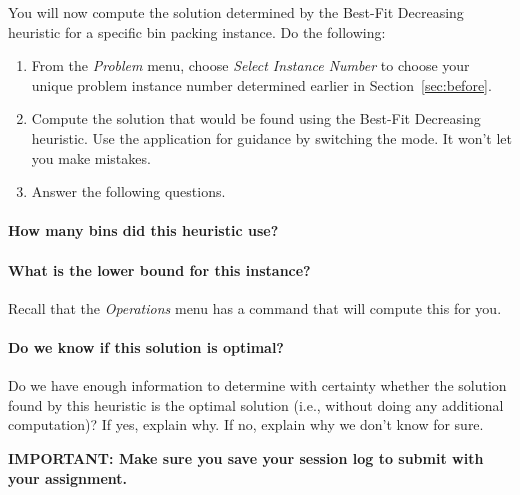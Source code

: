 \documentclass[11pt,letterpaper]{article}
\begin{document}
You will now compute the solution determined by the Best-Fit Decreasing
heuristic for a specific bin packing instance. Do the following:
\begin{enumerate}[leftmargin=*, parsep=0pt, itemsep=2pt, topsep=2pt, partopsep=0pt]
\item From the {\em Problem} menu, choose {\em Select Instance Number}
to choose your unique problem instance number determined earlier in 
Section~\ref{sec:before}.
\item Compute the solution that would be found using the Best-Fit Decreasing
heuristic. Use the application for guidance by switching the mode.
It won't let you make mistakes.
\item Answer the following questions.
\end{enumerate}

\vspace*{-0.25in}

\paragraph*{How many bins did this heuristic use?}

\vspace*{0.25in}

\paragraph*{What is the lower bound for this instance?} Recall that the
{\em Operations} menu has a command that will compute this for you.

\vspace*{0.25in}

\paragraph*{Do we know if this solution is optimal?} Do we have enough 
information to determine with certainty whether the solution found by
this heuristic is the optimal solution (i.e., without doing any additional
computation)? If yes, explain why. If no, explain why we don't know for sure.

\vspace*{0.5in}

\textbf{\large IMPORTANT: Make sure you save your session log to submit with your assignment.}
\end{document}
